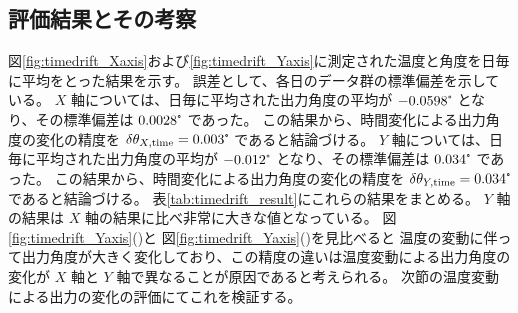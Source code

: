 \documentclass[../../main.tex]{subfiles}
\begin{document}
\subsection{評価結果とその考察}
図\ref{fig:timedrift_Xaxis}および\ref{fig:timedrift_Yaxis}に測定された温度と角度を日毎に平均をとった結果を示す。
誤差として、各日のデータ群の標準偏差を示している。
$X$ 軸については、日毎に平均された出力角度の平均が $-0.0598\tcdegree$ となり、その標準偏差は $0.0028\tcdegree$ であった。
この結果から、時間変化による出力角度の変化の精度を $\delta\theta_{X,\mathrm{time}} = 0.003\tcdegree$ であると結論づける。
$Y$ 軸については、日毎に平均された出力角度の平均が $-0.012\tcdegree$ となり、その標準偏差は $0.034\tcdegree$ であった。
この結果から、時間変化による出力角度の変化の精度を $\delta\theta_{Y,\mathrm{time}} = 0.034\tcdegree$ であると結論づける。
表\ref{tab:timedrift_result}にこれらの結果をまとめる。
$Y$ 軸の結果は $X$ 軸の結果に比べ非常に大きな値となっている。
図\ref{fig:timedrift_Yaxis}()と
図\ref{fig:timedrift_Yaxis}()を見比べると
温度の変動に伴って出力角度が大きく変化しており、この精度の違いは温度変動による出力角度の変化が $X$ 軸と $Y$ 軸で異なることが原因であると考えられる。
次節の温度変動による出力の変化の評価にてこれを検証する。
\end{document}

